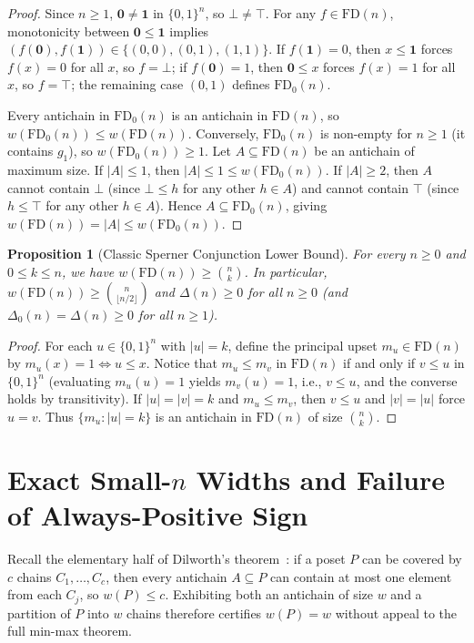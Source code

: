 \documentclass[11pt]{article}
\newtheorem{proposition}[theorem]{Proposition}
\theoremstyle{definition}
\newcommand{\FD}{\mathrm{FD}}
\newcommand{\FDz}{\mathrm{FD}_0}
\begin{document}
\begin{proof}
Since $n \ge 1$, $\mathbf{0} \ne \mathbf{1}$ in $\{0,1\}^n$, so $\bot \ne \top$. For any $f \in \FD(n)$, monotonicity between $\mathbf{0} \le \mathbf{1}$ implies $(f(\mathbf{0}), f(\mathbf{1})) \in \{(0,0), (0,1), (1,1)\}$. If $f(\mathbf{1}) = 0$, then $x \le \mathbf{1}$ forces $f(x) = 0$ for all $x$, so $f = \bot$; if $f(\mathbf{0}) = 1$, then $\mathbf{0} \le x$ forces $f(x) = 1$ for all $x$, so $f = \top$; the remaining case $(0,1)$ defines $\FDz(n)$.

Every antichain in $\FDz(n)$ is an antichain in $\FD(n)$, so $w(\FDz(n)) \le w(\FD(n))$. Conversely, $\FDz(n)$ is non-empty for $n \ge 1$ (it contains $g_1$), so $w(\FDz(n)) \ge 1$. Let $A \subseteq \FD(n)$ be an antichain of maximum size. If $|A| \le 1$, then $|A| \le 1 \le w(\FDz(n))$. If $|A| \ge 2$, then $A$ cannot contain $\bot$ (since $\bot \le h$ for any other $h \in A$) and cannot contain $\top$ (since $h \le \top$ for any other $h \in A$). Hence $A \subseteq \FDz(n)$, giving $w(\FD(n)) = |A| \le w(\FDz(n))$.
\end{proof}

\begin{proposition}[Classic Sperner Conjunction Lower Bound]\label{prop:conj-lb}
For every $n \ge 0$ and $0 \le k \le n$, we have $w(\FD(n)) \ge \binom{n}{k}$. In particular, $w(\FD(n)) \ge \binom{n}{\lfloor n/2 \rfloor}$ and $\Delta(n) \ge 0$ for all $n \ge 0$ (and $\Delta_0(n) = \Delta(n) \ge 0$ for all $n \ge 1$).
\end{proposition}

\begin{proof}
For each $u \in \{0,1\}^n$ with $|u| = k$, define the principal upset $m_u \in \FD(n)$ by $m_u(x) = 1 \iff u \le x$. Notice that $m_u \le m_v$ in $\FD(n)$ if and only if $v \le u$ in $\{0,1\}^n$ (evaluating $m_u(u) = 1$ yields $m_v(u) = 1$, i.e., $v \le u$, and the converse holds by transitivity). If $|u| = |v| = k$ and $m_u \le m_v$, then $v \le u$ and $|v| = |u|$ force $u = v$. Thus $\{m_u : |u| = k\}$ is an antichain in $\FD(n)$ of size $\binom{n}{k}$.
\end{proof}

\section{Exact Small-\texorpdfstring{$n$}{n} Widths and Failure of Always-Positive Sign}

Recall the elementary half of Dilworth's theorem~\cite{Dilworth1950}: if a poset $P$ can be covered by $c$ chains $C_1, \dots, C_c$, then every antichain $A \subseteq P$ can contain at most one element from each $C_j$, so $w(P) \le c$. Exhibiting both an antichain of size $w$ and a partition of $P$ into $w$ chains therefore certifies $w(P) = w$ without appeal to the full min-max theorem.
\end{document}
